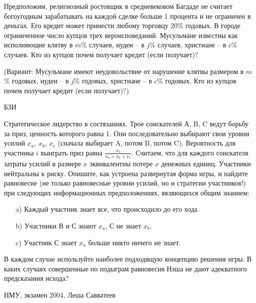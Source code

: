 \begin{problem}
Предположим, религиозный ростовщик в средневековом Багдаде
не считает богоугодным зарабатывать на каждой сделке больше
1 процента и не ограничен в деньгах. Его кредит может
принести любому торговцу 20\% годовых. В городе
ограниченное число купцов трех вероисповеданий. Мусульмане
известны как исполняющие клятву в $m$\% случаев, иудеи -- в
$j$\% случаев, христиане -- в $c$\% случаев. Кто из купцов
почем получает кредит (если получает)?

(Вариант: Мусульмане имеют неудовольствие от нарушение
клятвы размером в $m$\% годовых, иудеи -- в $j$\% годовых,
христиане -- в $c$\% годовых. Кто из купцов почем получает
кредит (если получает)?)



\begin{source}
БЗИ
\end{source}


\begin{sol}

\end{sol}
\end{problem}






\begin{problem}
Стратегическое лидерство в состязаниях. Трое соискателей А, B, C ведут борьбу за приз, ценность которого равна 1. Они последовательно выбирают свои уровни усилий $x_{a}$, $x_{b}$, $x_{c}$ (сначала выбирает A, потом B, потом C). Вероятность для участника $i$ выиграть приз равна $\frac{x_{i}}{x_{a}+x_{b}+x_{c}}$. Считаем, что для каждого соискателя затраты усилий в размере $x$ эквивалентны потере $x$ денежных единиц. Участники нейтральны к риску.
Опишите, как устроена развернутая форма игры, и найдите равновесие (не только равновесные уровни усилий, но и стратегии участников!) при следующих информационных предположениях, являющихся общим знанием:
\begin{itemize}
\item[a)] Каждый участник знает все, что происходило до его хода.
\item[b)] Участники В и С знают $x_{a}$, С не знает $x_{b}$.
\item[c)] Участник С знает $x_{a}$ больше никто ничего не знает.
\end{itemize}
В каждом случае используйте наиболее подходящую концепцию решения игры. В каких случаях совершенные по подыграм равновесия Нэша не дают адекватного предсказания исхода?



\begin{source}
НМУ, экзамен 2004, Леша Савватеев
\end{source}


\begin{sol}

\end{sol}
\end{problem}





